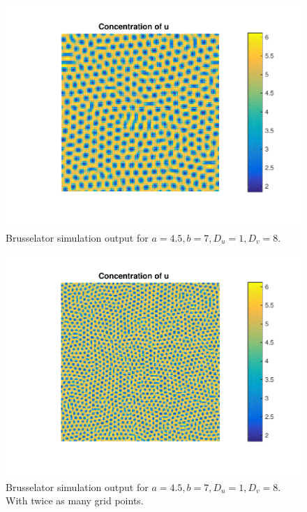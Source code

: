 \begin{figure}
\centering
\includegraphics[scale = 0.9]{./plots/cua4p5b7.pdf}
\caption{Brusselator simulation output for $a=4.5,b=7,D_u=1,D_v=8$.}
\label{fig:Brussl1}
\end{figure}
\begin{figure}
\centering
\includegraphics[scale = 0.9]{./plots/cua4p5b7g200.pdf}
\caption{Brusselator simulation output for $a=4.5,b=7,D_u=1,D_v=8$. With twice as many grid points.}
\label{fig:Brussl3}
\end{figure}
